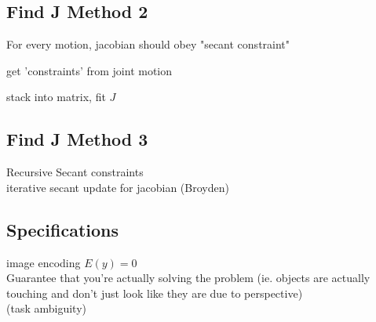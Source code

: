\documentclass{article}
\begin{document}
\subsection{Find J Method 2}
For every motion, jacobian should obey "secant constraint"
\begin{list}{}{}
    \item get 'constraints' from joint motion
    \item stack into matrix, fit $J$
\end{list}

\subsection{Find J Method 3}
Recursive Secant constraints\\
iterative secant update for jacobian (Broyden)


\subsection{Specifications}
image encoding $E(y) =0$\\
Guarantee that you're actually solving the problem (ie. objects are actually touching
and don't just look like they are due to perspective)
\\
(task ambiguity)
\end{document}
